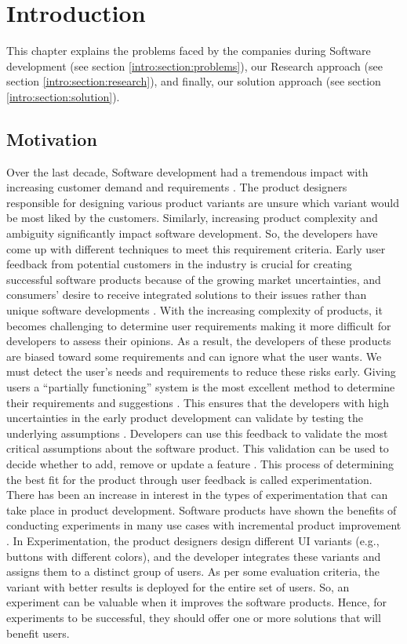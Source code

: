 \chapter{Introduction} \label{chap:intro}
This chapter explains the problems faced by the companies during Software development (see section \ref{intro:section:problems}), our Research approach (see section \ref{intro:section:research}), and finally, our solution approach (see section \ref{intro:section:solution}).

\section{Motivation}
Over the last decade, Software development had a tremendous impact with increasing customer demand and requirements \cite{article:swdemand:ahmed}. 
The product designers responsible for designing various product variants are unsure which variant would be most liked by the customers.
Similarly, increasing product complexity and ambiguity significantly impact software development. 
So, the developers have come up with different techniques to meet this requirement criteria.
Early user feedback from potential customers in the industry is crucial for creating successful software products because of the growing market uncertainties, and consumers' desire to receive integrated solutions to their issues rather than unique software developments \cite{misc:businessmodels:teece}.
With the increasing complexity of products, it becomes challenging to determine user requirements making it more difficult for developers to assess their opinions.
As a result, the developers of these products are biased toward some requirements and can ignore what the user wants. 
We must detect the user's needs and requirements to reduce these risks early. 
Giving users a ``partially functioning'' system is the most excellent method to determine their requirements and suggestions \cite{journal:prototyping:davis}.
This ensures that the developers with high uncertainties in the early product development can validate by testing the underlying assumptions \cite{misc:lean:steve}.
Developers can use this feedback to validate the most critical assumptions about the software product. 
This validation can be used to decide whether to add, remove or update a feature \cite{article:experiments:lindgren}. 
This process of determining the best fit for the product through user feedback is called experimentation.
There has been an increase in interest in the types of experimentation that can take place in product development. 
Software products have shown the benefits of conducting experiments in many use cases with incremental product improvement \cite{article:controlled:experiements}.
In Experimentation, the product designers design different UI variants (e.g., buttons with different colors), and the developer integrates these variants and assigns them to a distinct group of users. 
As per some evaluation criteria, the variant with better results is deployed for the entire set of users.
So, an experiment can be valuable when it improves the software products.
Hence, for experiments to be successful, they should offer one or more solutions that will benefit users.

